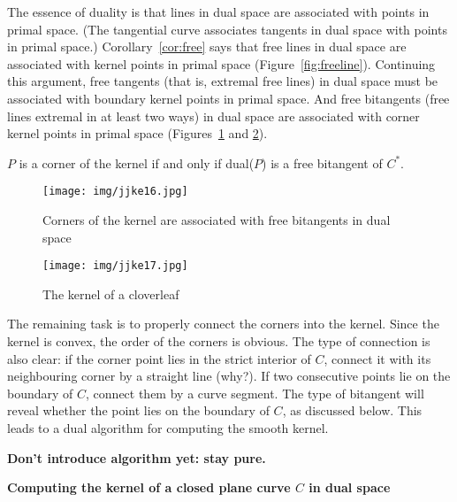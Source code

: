 \documentclass[12pt]{article}
\begin{document}
\noindent 
The essence of duality is that lines in dual space are associated
with points in primal space.
(The tangential curve associates tangents in dual space with points in
primal space.)
Corollary~\ref{cor:free} says that free lines in dual space
are associated with kernel points in primal space (Figure~\ref{fig:freeline}).
Continuing this argument, free tangents (that is, extremal free lines) 
in dual space must be associated with boundary kernel points in primal space.
And free bitangents (free lines extremal in at least two ways) in dual space 
are associated with corner kernel points in primal space 
(Figures~\ref{fig:kernelob1a} and \ref{fig:complex}).

\begin{lemma}
$P$ is a corner of the kernel if and only if dual($P$) is a free bitangent of $C^*$.
\end{lemma}

\begin{figure}
\begin{center}
\texttt{[image: img/jjke16.jpg]}
\end{center}
\caption{Corners of the kernel are associated with free bitangents in dual space}
\label{fig:kernelob1a}
\end{figure}

\begin{figure}
\begin{center}
\texttt{[image: img/jjke17.jpg]}
\end{center}
\caption{The kernel of a cloverleaf}
\label{fig:complex}
\end{figure}

The remaining task is to properly connect the corners into the kernel.
Since the kernel is convex, the order of the corners is obvious.
The type of connection is also clear: if the corner point lies in the strict
interior of $C$, connect it with its neighbouring corner by a straight line (why?).
If two consecutive points lie on the boundary of $C$, connect
them by a curve segment.
The type of bitangent will reveal whether the point lies on the boundary of $C$,
as discussed below.
This leads to a dual algorithm for computing the smooth kernel.

{\bf Don't introduce algorithm yet: stay pure.}

\centerline{{\bf Computing the kernel of a closed plane curve $C$ in dual space}}
\end{document}
